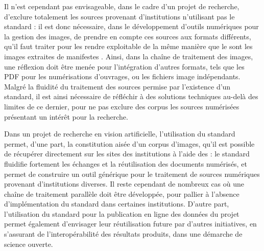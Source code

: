 Il n'est cependant pas envisageable, dans le cadre d'un projet de recherche, d'exclure totalement les sources provenant d'institutions n'utilisant pas le standard \iiif : il est donc nécessaire, dans le développement d'outils numériques pour la gestion des images, de prendre en compte ces sources aux formats différents, qu'il faut traiter pour les rendre exploitable de la même manière que le sont les images extraites de manifestes \iiif. Ainsi, dans la chaîne de traitement des images, une réflexion doit être menée pour l'intégration d'autres formats, tels que les PDF pour les numérisations d'ouvrages, ou les fichiers image indépendants. Malgré la fluidité du traitement des sources permise par l'existence d'un standard, il est ainsi nécessaire de réfléchir à des solutions techniques au-delà des limites de ce dernier, pour ne pas exclure des corpus les sources numérisées présentant un intérêt pour la recherche. 

Dans un projet de recherche en vision artificielle, l'utilisation du standard \iiif permet, d'une part, la constitution aisée d'un corpus d'images, qu'il est possible de récupérer directement sur les sites des institutions à l'aide des \api : le standard \iiif fluidifie fortement les échanges et la réutilisation des documents numérisés, et permet de construire un outil générique pour le traitement de sources numériques provenant d'institutions diverses. Il reste cependant de nombreux cas où une chaîne de traitement parallèle doit être développée, pour pallier à l'absence d'implémentation du standard dans certaines institutions. D'autre part, l'utilisation du standard \iiif pour la publication en ligne des données du projet permet également d'envisager leur réutilisation future par d'autres initiatives, en s'assurant de l'interopérabilité des résultats produits, dans une démarche de science ouverte.

